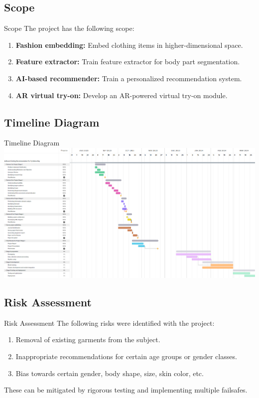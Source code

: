 \subsection{Scope}
\begin{frame}{Scope}
	The project has the following scope:
	\begin{enumerate}
		\item \textbf{Fashion embedding:} Embed clothing items in higher-dimensional space.
		\item \textbf{Feature extractor:} Train feature extractor for body part segmentation.
		\item \textbf{AI-based recommender:} Train a personalized recommendation system.
		\item \textbf{AR virtual try-on:} Develop an AR-powered virtual try-on module.
	\end{enumerate}
\end{frame}

\subsection{Timeline Diagram}
\begin{frame}{Timeline Diagram}
	\includegraphics[width=\textwidth]{components/images/timeline.png}
\end{frame}

\subsection{Risk Assessment}
\begin{frame}{Risk Assessment}
	The following risks were identified with the project:
	\begin{enumerate}
		\item Removal of existing garments from the subject.
		\item Inappropriate recommendations for certain age groups or gender classes.
		\item Bias towards certain gender, body shape, size, skin color, etc.
	\end{enumerate}
	These can be mitigated by rigorous testing and implementing multiple failsafes.
\end{frame}
